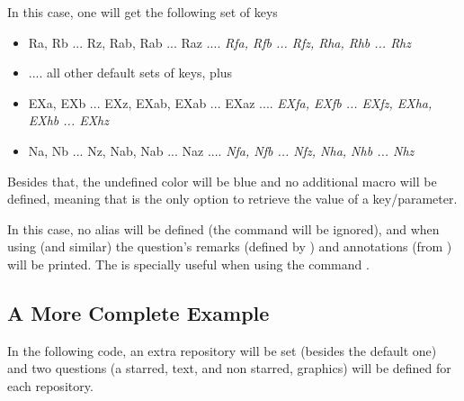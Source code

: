 \documentclass[10pt]{article}
\begin{document}
\begin{codestore}
\usepackage[xtrakeys={EX,N},xtraidx={f,h},undef color={blue},no defs]{tikzquests}
\end{codestore}


In this case, one will get the following set of keys

\begin{itemize}[nosep]
\item Ra, Rb ... Rz, Rab, Rab ... Raz .... \emph{Rfa, Rfb ... Rfz, Rha, Rhb ... Rhz}
\item .... all other default sets of keys, plus
\item EXa, EXb ... EXz, EXab, EXab ... EXaz .... \emph{EXfa, EXfb ... EXfz, EXha, EXhb ... EXhz}
\item Na, Nb ... Nz, Nab, Nab ... Naz .... \emph{Nfa, Nfb ... Nfz, Nha, Nhb ... Nhz}
\end{itemize}

Besides that, the undefined color will be blue and no additional macro will be defined, meaning that \tsobj{\QuestVal} is the only option to retrieve the value of a key/parameter.

\begin{codestore}
\usepackage[no alias, in review]{tikzquests}
\end{codestore}

In this case, no alias will be defined (the command  will be ignored), and when using \tsobj{\tikzQuestion} (and similar) the question's remarks (defined by ) and annotations (from \tsobj{\tikzQuestion}) will be printed. The  is specially useful when using the command \tsobj{\QuestionsList}.

\subsection{A More Complete Example}
In the following code, an extra repository will be set (besides the default one) and two questions (a starred, text, and non starred, graphics) will be defined for each repository.
\end{document}
